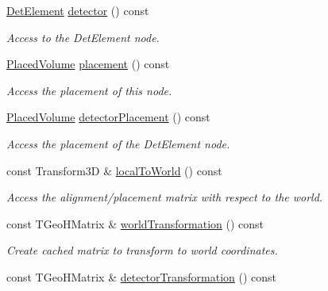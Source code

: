 \begin{DoxyCompactItemize}
\hyperlink{namespace_d_d4hep_a21dd977310ff183f61ca6ae14b59a989}{DetElement} \hyperlink{class_d_d4hep_1_1_alignments_1_1_alignment_decorator_a3b5cdf201d75aa7a02755608e168918f}{detector} () const 
\begin{DoxyCompactList}\small\item\em Access to the DetElement node. \item\end{DoxyCompactList}\item 
\hyperlink{class_d_d4hep_1_1_geometry_1_1_placed_volume}{PlacedVolume} \hyperlink{class_d_d4hep_1_1_alignments_1_1_alignment_decorator_a226538fa81c594913438a1507bff0af9}{placement} () const 
\begin{DoxyCompactList}\small\item\em Access the placement of this node. \item\end{DoxyCompactList}\item 
\hyperlink{class_d_d4hep_1_1_geometry_1_1_placed_volume}{PlacedVolume} \hyperlink{class_d_d4hep_1_1_alignments_1_1_alignment_decorator_a3878365e8537a2f1052c9b34b187c4e7}{detectorPlacement} () const 
\begin{DoxyCompactList}\small\item\em Access the placement of the DetElement node. \item\end{DoxyCompactList}\item 
const Transform3D \& \hyperlink{class_d_d4hep_1_1_alignments_1_1_alignment_decorator_af88b4832207460ad2bc610342ca5b35a}{localToWorld} () const 
\begin{DoxyCompactList}\small\item\em Access the alignment/placement matrix with respect to the world. \item\end{DoxyCompactList}\item 
const TGeoHMatrix \& \hyperlink{class_d_d4hep_1_1_alignments_1_1_alignment_decorator_a24ba22a61084c9247777db4ab9edf270}{worldTransformation} () const 
\begin{DoxyCompactList}\small\item\em Create cached matrix to transform to world coordinates. \item\end{DoxyCompactList}\item 
const TGeoHMatrix \& \hyperlink{class_d_d4hep_1_1_alignments_1_1_alignment_decorator_a729b16755c310d2a16a46bc5f9257341}{detectorTransformation} () const 

\end{DoxyCompactItemize}
